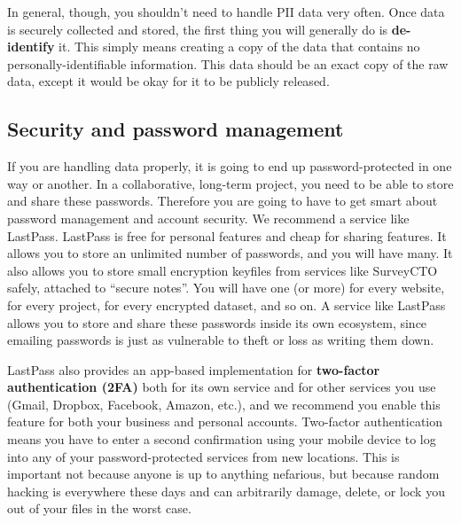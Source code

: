 In general, though, you shouldn't need to handle PII data very often.
Once data is securely collected and stored, the first thing you will generally do is \textbf{de-identify} it.
This 
simply means creating a copy of the data that contains no personally-identifiable information.
This data should be an exact copy of the raw data,
except it would be okay for it to be publicly released.\cite{matthews2011data}

\subsection{Security and password management}

If you are handling data properly, it is going to end up password-protected in one way or another.
In a collaborative, long-term project, you need to be able to store and share these passwords.
Therefore you are going to have to get smart about password management and account security.
We recommend a service like LastPass.
LastPass is free for personal features and cheap for sharing features.
It allows you to store an unlimited number of passwords, and you will have many.
It also allows you to store small encryption keyfiles from services like SurveyCTO safely, attached to ``secure notes''.
You will have one (or more) for every website, for every project, for every encrypted dataset, and so on.
A service like LastPass allows you to store and share these passwords inside its own ecosystem,
since emailing passwords is just as vulnerable to theft or loss as writing them down.

LastPass also provides an app-based implementation for
\textbf{two-factor authentication (2FA)}
both for its own service and for other services you use (Gmail, Dropbox, Facebook, Amazon, etc.),
and we recommend you enable this feature for both your business and personal accounts.
Two-factor authentication means you have to enter a second confirmation using your mobile device
to log into any of your password-protected services from new locations.
This is important not because anyone is up to anything nefarious,
but because random hacking is everywhere these days
and can arbitrarily damage, delete, or lock you out of your files in the worst case.
